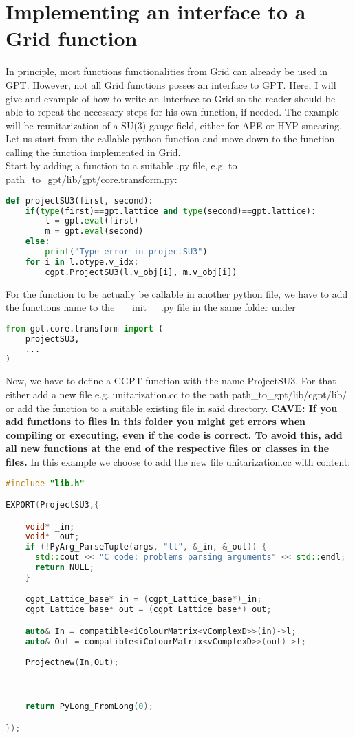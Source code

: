 \documentclass[a4paper,10pt]{scrartcl}
\begin{document}
\section{Implementing an interface to a Grid function}
In principle, most functions functionalities from Grid can already be used in GPT. However, not all Grid functions posses an interface to GPT.
Here, I will give and example of how to write an Interface to Grid so the reader should be able to repeat the necessary steps for his own function, if needed.
The example will be reunitarization of a SU(3) gauge field, either for APE or HYP smearing. Let us start from the callable 
python function and move down to the function calling the function implemented in Grid.\\
Start by adding a function to a suitable .py file, e.g. to path\_to\_gpt/lib/gpt/core.transform.py:
\begin{lstlisting}[language=python]
def projectSU3(first, second):
    if(type(first)==gpt.lattice and type(second)==gpt.lattice):
        l = gpt.eval(first)
        m = gpt.eval(second)
    else:
        print("Type error in projectSU3")
    for i in l.otype.v_idx:
        cgpt.ProjectSU3(l.v_obj[i], m.v_obj[i])
\end{lstlisting}
For the function to be actually be callable in another python file, we have to add the functions name to the \_\_init\_\_.py file in the same folder under
\begin{lstlisting}[language=python]
from gpt.core.transform import (
    projectSU3,
    ...
)
\end{lstlisting}
Now, we have to define a CGPT function with the name ProjectSU3. For that either add a new file e.g. unitarization.cc to the path path\_to\_gpt/lib/cgpt/lib/
or add the function to a suitable existing file in said directory. \textbf{CAVE: If you add functions to files in this folder you might get errors when 
compiling or executing, even if the code is correct. To avoid this, add all new functions at the end of the respective files or classes in the files.} 
In this example we choose to add the new file unitarization.cc with content:
\begin{lstlisting}[language=C++]
#include "lib.h"

EXPORT(ProjectSU3,{

    void* _in;
    void* _out;
    if (!PyArg_ParseTuple(args, "ll", &_in, &_out)) {
      std::cout << "C code: problems parsing arguments" << std::endl;
      return NULL;
    }

    cgpt_Lattice_base* in = (cgpt_Lattice_base*)_in;
    cgpt_Lattice_base* out = (cgpt_Lattice_base*)_out;

    auto& In = compatible<iColourMatrix<vComplexD>>(in)->l;
    auto& Out = compatible<iColourMatrix<vComplexD>>(out)->l;
    
    Projectnew(In,Out);



    return PyLong_FromLong(0);    

});

\end{lstlisting}
\end{document}
